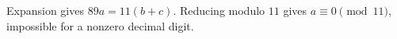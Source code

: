 Expansion gives $89a=11(b+c)$. Reducing modulo $11$ gives $a\equiv0\pmod {11}$, impossible for a nonzero decimal digit.
